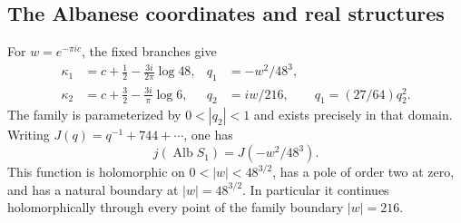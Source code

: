 \subsection{The Albanese coordinates and real structures}
\begin{proposition}\label{ari:C.2.1}
For $w=e^{-\pi ic}$, the fixed branches give
\begin{align*}
 \kappa_1&=c+\tfrac12-\frac{3i}{2\pi}\log48,&
 q_1&=-w^2/48^3,\\
 \kappa_2&=c+\tfrac32-\frac{3i}{\pi}\log6,&
 q_2&=iw/216,\qquad q_1=(27/64)q_2^2.
\end{align*}
The family is parameterized by $0<|q_2|<1$ and exists precisely in
that domain. Writing $J(q)=q^{-1}+744+\cdots$, one has
\[
 j(\operatorname{Alb}S_1)=J(-w^2/48^3).
\]
This function is holomorphic on $0<|w|<48^{3/2}$, has a pole of order
two at zero, and has a natural boundary at $|w|=48^{3/2}$.
In particular it continues holomorphically through every point of the
family boundary $|w|=216$.
\end{proposition}

